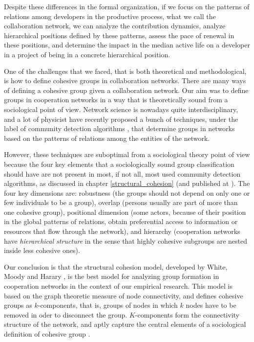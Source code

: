 Despite these differences in the formal organization, if we focus on the patterns of relations among developers in the productive process, what we call the collaboration network, we can analyze the contribution dynamics, analyze hierarchical positions defined by these patterns, assess the pace of renewal in these positions, and determine the impact in the median active life on a developer in a project of being in a concrete hierarchical position.

One of the challenges that we faced, that is both theoretical and methodological, is how to define cohesive groups in collaboration networks. There are many ways of defining a cohesive group given a collaboration network. Our aim was to define groups in cooperation networks in a way that is theoretically sound from a sociological point of view. Network science is nowadays quite interdisciplinary, and a lot of physicist have recently proposed a bunch of techniques, under the label of community detection algorithms \citep{fortunato:2010}, that determine groups in networks based on the patterns of relations among the entities of the network.

However, these techniques are suboptimal from a sociological theory point of view because the four key elements that a sociologically sound group classification should have are not present in most, if not all, most used community detection algorithms, as discussed in chapter \ref{structural_cohesion} (and published at \citep{torrents:2015}). The four key dimensions are: robustness (the groups should not depend on only one or few individuals to be a group), overlap (persons usually are part of more than one cohesive group), positional dimension (some actors, because of their position in the global patterns of relations, obtain preferential access to information or resources that flow through the network), and hierarchy (cooperation networks have \emph{hierarchical structure} in the sense that highly cohesive subgroups are nested inside less cohesive ones).

Our conclusion is that the structural cohesion model, developed by White, Moody and Harary \citep{white:2001, moody:2003}, is the best model for analyzing group formation in cooperation networks in the context of our empirical research. This model is based on the graph theoretic measure of node connectivity, and defines cohesive groups as $k$-components, that is, groups of nodes in which $k$ nodes have to be removed in oder to disconnect the group. $K$-components form the connectivity structure of the network, and aptly capture the central elements of a sociological definition of cohesive group \citep{torrents:2015}.

